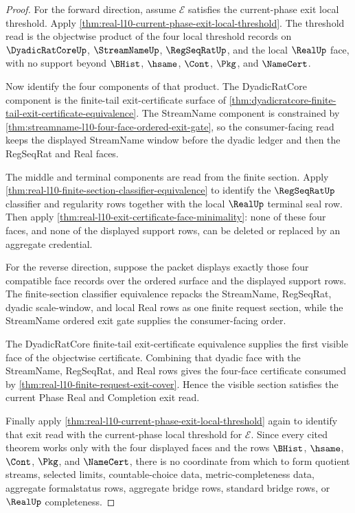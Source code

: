 \begin{proof}
For the forward direction, assume $\mathcal E$ satisfies the current-phase exit local threshold. Apply \autoref{thm:real-l10-current-phase-exit-local-threshold}. The threshold read is the objectwise product of the four local threshold records on $\DyadicRatCoreUp$, $\StreamNameUp$, $\RegSeqRatUp$, and the local $\RealUp$ face, with no support beyond $\BHist$, $\hsame$, $\Cont$, $\Pkg$, and $\NameCert$.

Now identify the four components of that product. The DyadicRatCore component is the finite-tail exit-certificate surface of \autoref{thm:dyadicratcore-finite-tail-exit-certificate-equivalence}. The StreamName component is constrained by \autoref{thm:streamname-l10-four-face-ordered-exit-gate}, so the consumer-facing read keeps the displayed StreamName window before the dyadic ledger and then the RegSeqRat and Real faces.

The middle and terminal components are read from the finite section. Apply \autoref{thm:real-l10-finite-section-classifier-equivalence} to identify the $\RegSeqRatUp$ classifier and regularity rows together with the local $\RealUp$ terminal seal row. Then apply \autoref{thm:real-l10-exit-certificate-face-minimality}: none of these four faces, and none of the displayed support rows, can be deleted or replaced by an aggregate credential.

For the reverse direction, suppose the packet displays exactly those four compatible face records over the ordered surface and the displayed support rows. The finite-section classifier equivalence repacks the StreamName, RegSeqRat, dyadic scale-window, and local Real rows as one finite request section, while the StreamName ordered exit gate supplies the consumer-facing order.

The DyadicRatCore finite-tail exit-certificate equivalence supplies the first visible face of the objectwise certificate. Combining that dyadic face with the StreamName, RegSeqRat, and Real rows gives the four-face certificate consumed by \autoref{thm:real-l10-finite-request-exit-cover}. Hence the visible section satisfies the current Phase Real and Completion exit read.

Finally apply \autoref{thm:real-l10-current-phase-exit-local-threshold} again to identify that exit read with the current-phase local threshold for $\mathcal E$. Since every cited theorem works only with the four displayed faces and the rows $\BHist$, $\hsame$, $\Cont$, $\Pkg$, and $\NameCert$, there is no coordinate from which to form quotient streams, selected limits, countable-choice data, metric-completeness data, aggregate formalstatus rows, aggregate bridge rows, standard bridge rows, or $\RealUp$ completeness.
\end{proof}

